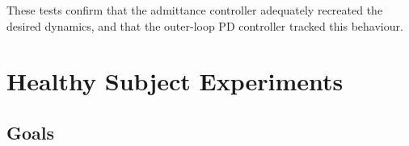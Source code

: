 \documentclass[12pt]{report}
\begin{document}
	

	
		
	These tests confirm that the admittance controller adequately recreated the desired dynamics, and that the outer-loop PD controller tracked this behaviour.
	
	
	
	
	\section{Healthy Subject Experiments}
	
		\subsection{Goals}
	
\end{document}
